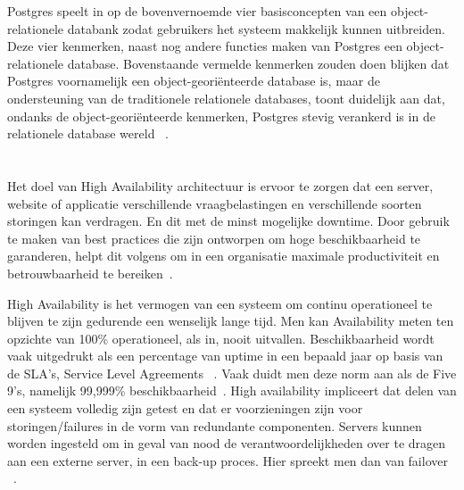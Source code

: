 Postgres speelt in op de bovenvernoemde vier basisconcepten van een object-relationele databank zodat gebruikers het systeem makkelijk kunnen uitbreiden. Deze vier kenmerken, naast nog andere functies maken van Postgres een object-relationele database. Bovenstaande vermelde kenmerken zouden doen blijken dat Postgres voornamelijk een object-georiënteerde database is, maar de ondersteuning van de traditionele relationele databases, toont duidelijk aan dat, ondanks de object-georiënteerde kenmerken, Postgres stevig verankerd is in de relationele database wereld ~\autocite{PostgreSQL2021a}.




\section{}
\label{sec:High Availability}

Het doel van High Availability architectuur is ervoor te zorgen dat een server, website of applicatie verschillende vraagbelastingen en verschillende soorten storingen kan verdragen. En dit met de minst mogelijke downtime. Door gebruik te maken van best practices die zijn ontworpen om hoge beschikbaarheid te garanderen, helpt dit volgens \textcite{Australia2017} om in een organisatie maximale productiviteit en betrouwbaarheid te bereiken~\autocite{Australia2017}. 



High Availability is het vermogen van een systeem om continu operationeel te blijven te zijn gedurende een wenselijk lange tijd. Men kan Availability meten ten opzichte van 100\% operationeel, als in, nooit uitvallen. Beschikbaarheid wordt vaak uitgedrukt als een percentage van uptime in een bepaald jaar op basis van de SLA's, Service Level Agreements ~\autocite{Kumar2020}. Vaak duidt men deze norm aan als de Five 9's, namelijk 99,999\% beschikbaarheid~\autocite{Lutkevich2021}. High availability impliceert dat delen van een systeem volledig zijn getest en dat er voorzieningen zijn voor storingen/failures in de vorm van redundante componenten. Servers kunnen worden ingesteld om in geval van nood de verantwoordelijkheden over te dragen aan een externe server, in een back-up proces. Hier spreekt men dan van failover ~\autocite{Technopedia2021a}.

